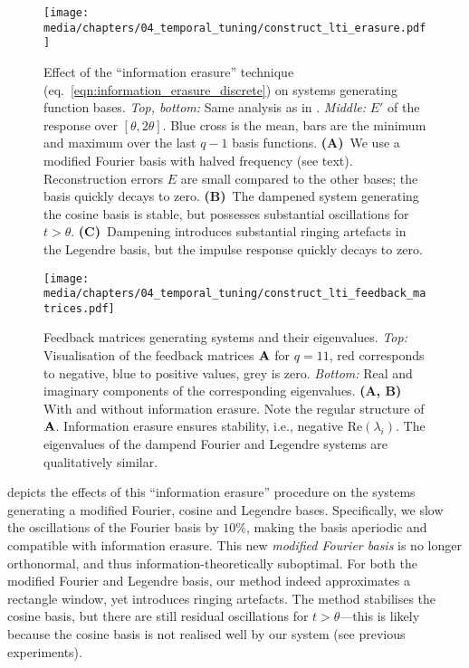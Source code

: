 \begin{figure}
	\centering
	\texttt{[image: media/chapters/04\_temporal\_tuning/construct\_lti\_erasure.pdf]}%
	{\label{fig:construct_lti_erasure_a}}%
	{\label{fig:construct_lti_erasure_b}}%
	{\label{fig:construct_lti_erasure_c}}
	\caption[Effect of the \enquote{information erasure} technique on LTI systems generating function bases]{
	Effect of the \enquote{information erasure} technique (eq.~\ref{eqn:information_erasure_discrete}) on \LTI systems generating function bases.
	\emph{Top, bottom:} Same analysis as in .
	\emph{Middle:} \RMS $E'$ of the response over $[\theta, 2\theta]$.
	Blue cross is the mean, bars are the minimum and maximum over the last $q - 1$ basis functions.
	\textbf{(A)}~We use a modified Fourier basis with halved frequency (see text).
	Reconstruction errors $E$ are small compared to the other bases; the basis quickly decays to zero.
	\textbf{(B)}~The dampened \LTI system generating the cosine basis is stable, but possesses substantial oscillations for $t > \theta$.
	\textbf{(C)}~Dampening introduces substantial ringing artefacts in the Legendre basis, but the impulse response quickly decays to zero.
	}
	\label{fig:construct_lti_erasure}
\end{figure}

\begin{figure}
	\centering
	\texttt{[image: media/chapters/04\_temporal\_tuning/construct\_lti\_feedback\_matrices.pdf]}
	\caption[Feedback matrices generating LTI systems and their eigenvalues]{Feedback matrices generating \LTI systems and their eigenvalues.
	\emph{Top:} Visualisation of the feedback matrices $\mathbf{A}$ for $q = 11$, red corresponds to negative, blue to positive values, grey is zero. \emph{Bottom:} Real and imaginary components of the corresponding eigenvalues. \textbf{(A, B)} With and without information erasure.
	Note the regular structure of $\mathbf{A}$. Information erasure ensures stability, i.e., negative $\mathrm{Re}(\lambda_i)$.
	The eigenvalues of the dampend Fourier and Legendre systems are qualitatively similar.
	}
	\label{fig:construct_lti_feedback_matrices}
\end{figure}

 depicts the effects of this \enquote{information erasure} procedure on the \LTI systems generating a modified Fourier, cosine and Legendre bases.
Specifically, we slow the oscillations of the Fourier basis by $10\%$, making the basis aperiodic and compatible with information erasure.
This new \emph{modified Fourier basis} is no longer orthonormal, and thus information-theoretically suboptimal.
For both the modified Fourier and Legendre basis, our method indeed approximates a rectangle window, yet introduces ringing artefacts.
The method stabilises the cosine basis, but there are still residual oscillations for $t > \theta$---this is likely because the cosine basis is not realised well by our \LTI system (see previous experiments).

